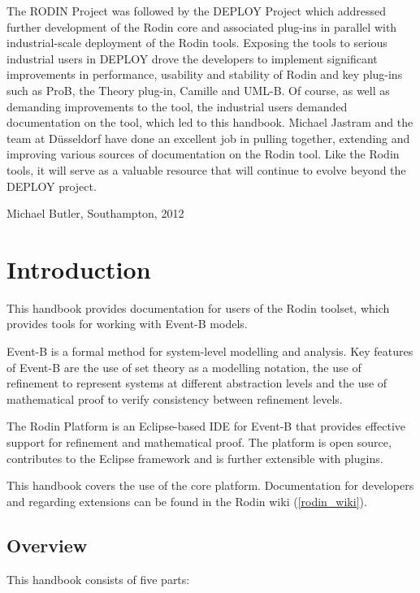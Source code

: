 \documentclass[twoside,10pt]{book}
\begin{document}
The RODIN Project was followed by the DEPLOY Project which addressed further development of the Rodin core and associated plug-ins in parallel with industrial-scale deployment of the Rodin tools.  Exposing the tools to serious industrial users in DEPLOY drove the developers to implement significant improvements in performance, usability and stability of Rodin and key plug-ins such as ProB, the Theory plug-in, Camille and UML-B.  Of course, as well as demanding improvements to the tool, the industrial users demanded documentation on the tool, which led to this handbook.  Michael Jastram and the team at D\"{u}sseldorf have done an excellent job in pulling together, extending and improving various sources of documentation on the Rodin tool.  Like the Rodin tools, it will serve as a valuable resource that will continue to evolve beyond the DEPLOY project.

\begin{flushright}Michael Butler, Southampton, 2012\end{flushright}

\chapter{Introduction}
\label{introduction}

This handbook provides documentation for users of the Rodin toolset, which provides tools for working with Event-B models.

Event-B is a formal method for system-level modelling and analysis. Key features of Event-B are the use of set theory as a modelling notation, the use of refinement to represent systems at different abstraction levels and the use of mathematical proof to verify consistency between refinement levels.

The Rodin Platform is an Eclipse-based IDE for Event-B that provides effective support for refinement and mathematical proof. The platform is open source, contributes to the Eclipse framework and is further extensible with plugins. 

This handbook covers the use of the core platform.  Documentation for developers and regarding extensions can be found in the Rodin wiki (\ref{rodin_wiki}).

\section{Overview}

This handbook consists of five parts:
\end{document}
